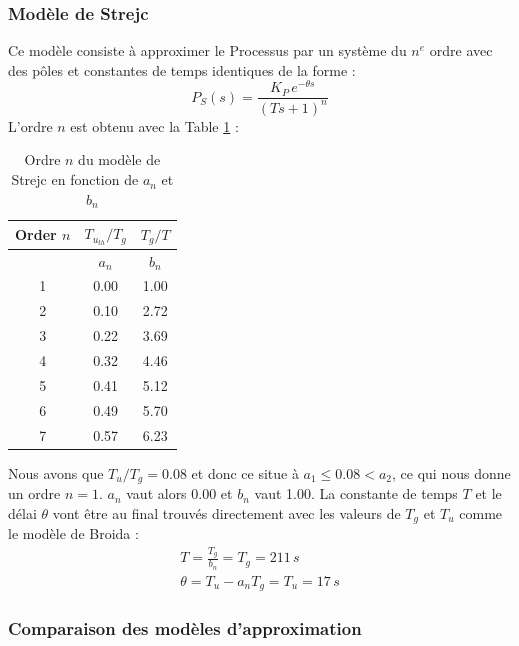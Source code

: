 \documentclass{article}
\begin{document}
\subsubsection{Modèle de Strejc}
Ce modèle consiste à approximer le Processus par un système du $n^{e}$ ordre avec des pôles et constantes de temps identiques de la forme :
\begin{equation*}
    P_S(s) = \frac{K_P\,e^{-\theta s}}{(T s + 1)^n}
\end{equation*}
L'ordre $n$ est obtenu avec la Table \ref{tab:Strejc_order} :
\begin{table}[H]
    \centering
    \begin{tabular}{|c|c|c|} 
        \hline
        Order $n$ & $T_{u_{th}}/T_g$ & $T_g/T$ \\
        \hline
         & $a_n$ & $b_n$ \\
        \hline
        1 & 0.00 & 1.00 \\
        \hline
        2 & 0.10 & 2.72 \\
        \hline
        3 & 0.22 & 3.69 \\
        \hline
        4 & 0.32 & 4.46 \\
        \hline
        5 & 0.41 & 5.12 \\
        \hline
        6 & 0.49 & 5.70 \\
        \hline
        7 & 0.57 & 6.23 \\
        \hline
    \end{tabular}
    \caption{Ordre $n$ du modèle de Strejc en fonction de $a_n$ et $b_n$}
    \label{tab:Strejc_order}
\end{table}
Nous avons que $T_u/T_g = 0.08$ et donc ce situe à $a_1 \leq 0.08 < a_2$, ce qui nous donne un ordre $n = 1$. $a_n$ vaut alors 0.00 et $b_n$ vaut 1.00.
La constante de temps $T$ et le délai $\theta$ vont être au final trouvés directement avec les valeurs de $T_g$ et $T_u$ comme le modèle de Broida :
\begin{align*}
    T = \frac{T_g}{b_n} = T_g = 211\,s\\
    \theta = T_u - a_n T_g = T_u = 17\,s
\end{align*}

\subsubsection{Comparaison des modèles d'approximation}
\end{document}
